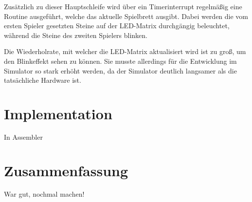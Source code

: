 Zusätzlich zu dieser Hauptschleife wird über ein Timerinterrupt regelmäßig eine Routine ausgeführt, welche das aktuelle Spielbrett ausgibt. Dabei werden die vom ersten Spieler gesetzten Steine auf der LED-Matrix durchgängig beleuchtet, während die Steine des zweiten Spielers blinken.

\begin{defStrich}[Hinweis]
  Die Wiederholrate, mit welcher die LED-Matrix aktualisiert wird ist zu groß, um den Blinkeffekt sehen zu können. Sie musste allerdings für die Entwicklung im Simulator so stark erhöht werden, da der Simulator deutlich langsamer als die tatsächliche Hardware ist.
\end{defStrich}

\chapter{Implementation}

In Assembler

\chapter{Zusammenfassung}

War gut, nochmal machen!


